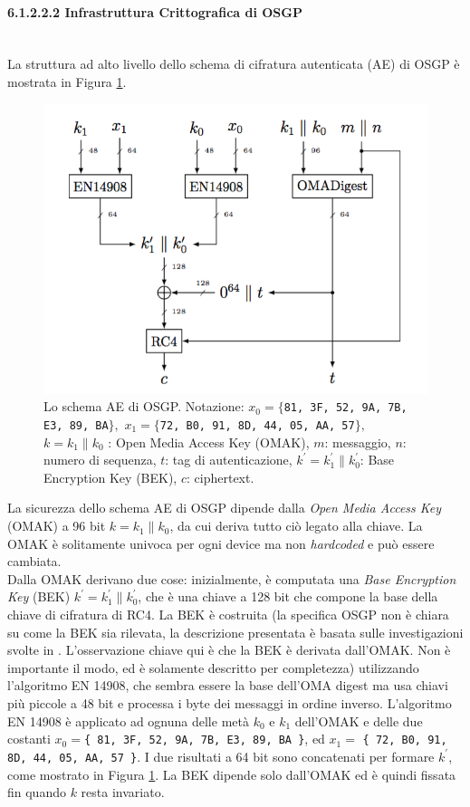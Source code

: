 \paragraph{6.1.2.2.2 Infrastruttura Crittografica di OSGP}\mbox{}\\
La struttura ad alto livello dello schema di cifratura autenticata (AE) di OSGP è mostrata in Figura \ref{osgp_img}.
\begin{figure}[hbtp]
	\centering
	\includegraphics[scale=.5]{imgs/attack/osgp.png}
	\caption{Lo schema AE di OSGP. Notazione: $x_0 = \{${\tt 81, 3F, 52, 9A, 7B, E3, 89, BA}$\},$ $x_1 = \{${\tt 72, B0, 91, 8D, 44, 05, AA, 57}$\},$ $k = k_1 \| k_0$ : Open Media Access Key (OMAK), $m$: messaggio, $n$: numero di sequenza, $t$: tag di autenticazione, $k^\prime = k^{\prime}_{1} \| k^{\prime}_{0}$: Base Encryption Key (BEK), $c$: ciphertext.}
	\label{osgp_img}
\end{figure}
La sicurezza dello schema AE di OSGP dipende dalla \textit{Open Media Access Key} (OMAK) a 96 bit $k = k_1 \| k_0$, da cui deriva tutto ciò legato alla chiave. La OMAK è solitamente univoca per ogni device ma non \textit{hardcoded} e può essere cambiata.\\
Dalla OMAK derivano due cose: inizialmente, è computata una \emph{Base Encryption Key} (BEK) $k^\prime =  k^{\prime}_{1} \| k^{\prime}_{0}$, che è una chiave a 128 bit che compone la base della chiave di cifratura di RC4. La BEK è costruita (la specifica OSGP non è chiara su come la BEK sia rilevata, la descrizione presentata è basata sulle investigazioni svolte in \cite{dumbcrypto}. L'osservazione chiave qui è che la BEK è derivata dall'OMAK. Non è importante il modo, ed è solamente descritto per completezza) utilizzando l'algoritmo EN 14908, che sembra essere la base dell'OMA digest ma usa chiavi più piccole a 48 bit e processa i byte dei messaggi in ordine inverso. L'algoritmo EN 14908 è applicato ad ognuna delle metà $k_0$ e $k_1$ dell'OMAK e delle due costanti $x_0 = ${\tt \{ 81, 3F, 52, 9A, 7B, E3, 89, BA \}}, ed $x_1 = $ {\tt \{ 72, B0, 91, 8D, 44, 05, AA, 57 \}}. I due risultati a 64 bit sono concatenati per formare $k^{\prime}$, come mostrato in Figura \ref{osgp_img}. La BEK dipende solo dall'OMAK ed è quindi fissata fin quando $k$ resta invariato.\\
